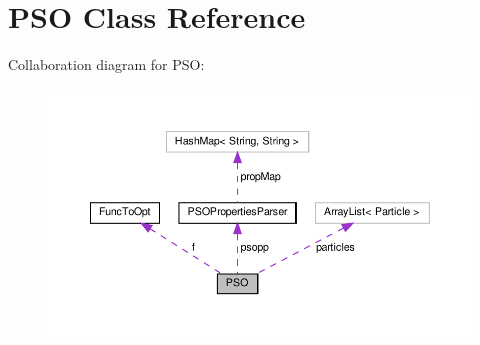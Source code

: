 \hypertarget{class_p_s_o}{}\section{P\+SO Class Reference}
\label{class_p_s_o}


Collaboration diagram for P\+SO\+:
\nopagebreak
\begin{figure}[H]
\begin{center}
\leavevmode
\includegraphics[width=350pt]{class_p_s_o__coll__graph}
\end{center}
\end{figure}
